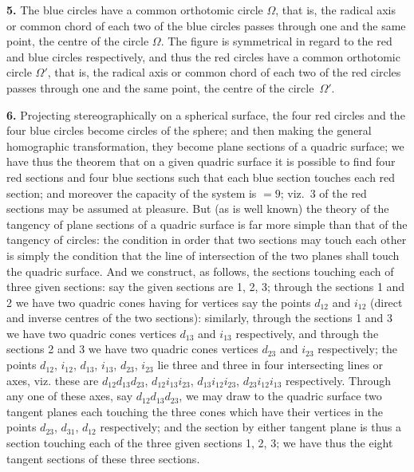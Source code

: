 \documentclass[11pt,a4paper]{book}
\begin{document}
\textbf{5.} The blue circles have a common orthotomic circle $\Omega$, that is, the radical axis or common chord of each two of the blue circles passes through one and the same point, the centre of the circle $\Omega$. The figure is symmetrical in regard to the red and blue circles respectively, and thus the red circles have a common orthotomic circle $\Omega'$, that is, the radical axis or common chord of each two of the red circles passes through one and the same point, the centre of the circle~$\Omega'$.

\textbf{6.} Projecting stereographically on a spherical surface, the four red circles and the four blue circles become circles of the sphere; and then making the general homographic transformation, they become plane sections of a quadric surface; we have thus the theorem that on a given quadric surface it is possible to find four red sections and four blue sections such that each blue section touches each red section; and moreover the capacity of the system is $=9$; viz.~3 of the red sections may be assumed at pleasure. But (as is well known) the theory of the tangency of plane sections of a quadric surface is far more simple than that of the tangency of circles: the condition in order that two sections may touch each other is simply the condition that the line of intersection of the two planes shall touch the quadric surface. And we construct, as follows, the sections touching each of three given sections: say the given sections are 1, 2, 3; through the sections 1 and 2 we have two quadric cones having for vertices say the points $d_{12}$ and $i_{12}$ (direct and inverse centres of the two sections): similarly, through the sections 1 and 3 we have two quadric cones vertices $d_{13}$ and $i_{13}$ respectively, and through the sections 2 and 3 we have two quadric cones vertices $d_{23}$ and $i_{23}$ respectively; the points $d_{12}$, $i_{12}$, $d_{13}$, $i_{13}$, $d_{23}$, $i_{23}$ lie three and three in four intersecting lines or axes, viz. these are $d_{12}d_{13}d_{23}$, $d_{12}i_{13}i_{23}$, $d_{13}i_{12}i_{23}$, $d_{23}i_{12}i_{13}$ respectively. Through any one of these axes, say $d_{12}d_{13}d_{23}$, we may draw to the quadric surface two tangent planes each touching the three cones which have their vertices in the points $d_{23}$, $d_{31}$, $d_{12}$ respectively; and the section by either tangent plane is thus a section touching each of the three given sections 1, 2, 3; we have thus the eight tangent sections of these three sections.
\end{document}
